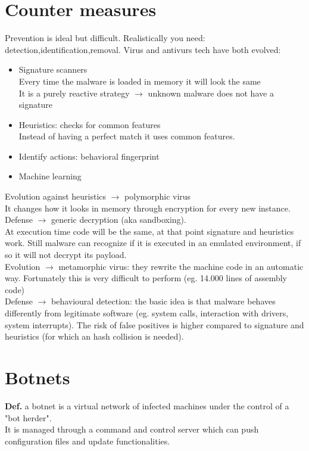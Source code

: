 \documentclass[10pt,a4paper]{book}
\begin{document}
\section{Counter measures}
Prevention is ideal but difficult. Realistically you need: detection,identification,removal. Virus and antivurs tech have both evolved:
\begin{itemize}
\item Signature scanners\\
Every time the malware is loaded in memory it will look the same\\
It is a purely reactive strategy $\to$ unknown malware does not have a signature
\item Heuristics: checks for common features\\
Instead of having a perfect match it uses common features.
\item Identify actions: behavioral fingerprint
\item Machine learning
\end{itemize}
Evolution against heuristics $\to$ polymorphic virus\\
It changes how it looks in memory through encryption for every new instance.\\
Defense $\to$ generic decryption (aka sandboxing).\\
At execution time code will be the same, at that point signature and heuristics work. Still malware can recognize if it is executed in an emulated environment, if so it will not decrypt its payload.\\
Evolution $\to$ metamorphic virus: they rewrite the machine code in an automatic way. Fortunately this is very difficult to perform (eg. 14.000 lines of assembly code)\\
Defense $\to$ behavioural detection: the basic idea is that malware behaves differently from legitimate software (eg. system calls, interaction with drivers, system interrupts). The risk of false positives is higher compared to signature and heuristics (for which an hash collision is needed).
\newpage
\section{Botnets}
\textbf{Def.} a botnet is a virtual network of infected machines under the control of a "bot herder".\\
It is managed through a command and control server which can push configuration files and update functionalities.
\end{document}
